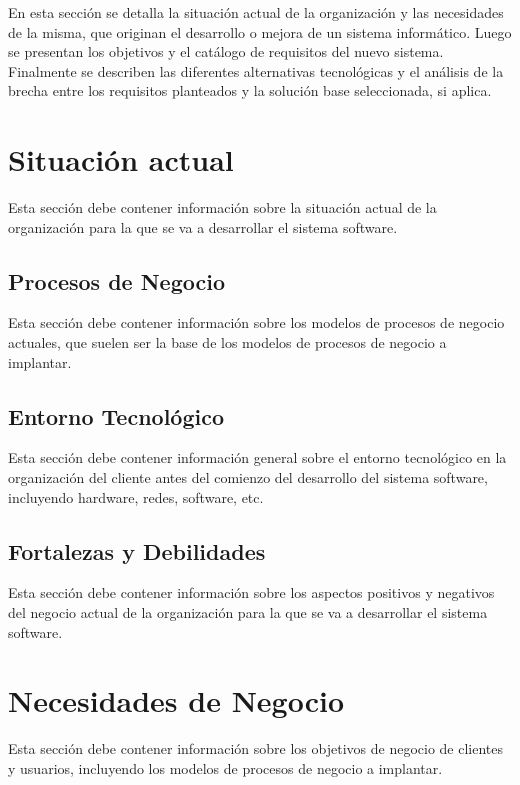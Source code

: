 

En esta sección se detalla la situación actual de la organización y las necesidades de la misma, que originan el desarrollo o mejora de un sistema informático. Luego se presentan los objetivos y el catálogo de requisitos del nuevo sistema. Finalmente se describen las diferentes alternativas tecnológicas y el análisis de la brecha entre los requisitos planteados y la solución base seleccionada, si aplica.

\section{Situación actual} 
Esta sección debe contener información sobre la situación actual de la organización para la que se va a desarrollar el sistema software.

\subsection{Procesos de Negocio}
Esta sección debe contener información sobre los modelos de procesos de negocio actuales, que suelen ser la base de los modelos de procesos de negocio a implantar.

\subsection{Entorno Tecnológico}
Esta sección debe contener información general sobre el entorno tecnológico en la organización del cliente antes del comienzo del desarrollo del sistema software, incluyendo hardware, redes, software, etc.

\subsection{Fortalezas y Debilidades}
Esta sección debe contener información sobre los aspectos positivos y negativos del negocio actual de la organización para la que se va a desarrollar el sistema software.

\section{Necesidades de Negocio}
Esta sección debe contener información sobre los objetivos de negocio de clientes y usuarios, incluyendo los modelos de procesos de negocio a implantar.

